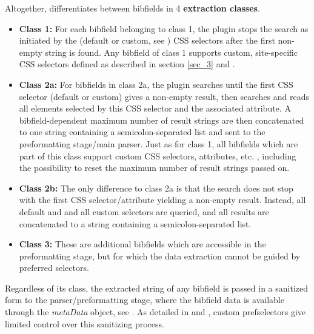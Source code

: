 \documentclass[
a4paper,
12pt,
]
{article}
\begin{document}
 Altogether, {\plgname} differentiates between bibfields in 4 \textbf{extraction classes}.
 \begin{itemize}
  \item \textbf{Class 1:} For each bibfield belonging to class 1, the plugin stops the search as initiated by the (default or custom, see ) CSS selectors after the first non-empty string is found. Any bibfield of class 1 supports custom, site-specific CSS selectors defined as described in section \ref{sec_3} and .
  
  \item \textbf{Class 2a:} For bibfields in class 2a, the plugin searches until the first CSS selector (default or custom) gives a non-empty result, then searches and reads all elements selected by this CSS selector and the associated attribute. A bibfield-dependent maximum number of result strings are then concatenated to one string containing a semicolon-separated list and sent to the preformatting stage/main parser. Just as for class 1, all bibfields which are part of this class support custom CSS selectors, attributes, etc. , including the possibility to reset the maximum number of result strings passed on.
  
  \item \textbf{Class 2b:} The only difference to class 2a is that the search does not stop with the first CSS selector/attribute yielding a non-empty result. Instead, all default and and all custom selectors are queried, and all results are concatenated to a string containing a semicolon-separated list.
  
  \item \textbf{Class 3:} These are additional bibfields which are accessible in the preformatting stage, but for which the data extraction cannot be guided by preferred selectors.
  
 \end{itemize}
 
 Regardless of its class, the extracted string of any bibfield is passed in a sanitized form to the parser/preformatting stage, where the bibfield data is available through the \textit{metaData} object, see . As detailed in  and , custom prefselectors give limited control over this sanitizing process.
 
\end{document}
